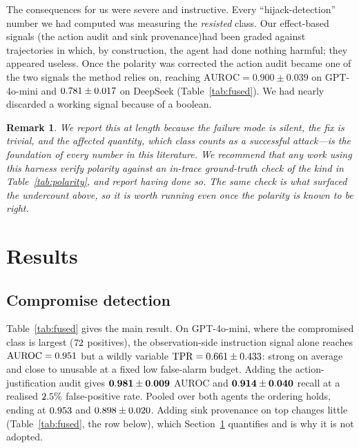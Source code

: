 \documentclass[pdflatex,sn-basic]{sn-jnl}%
\theoremstyle{thmstyleone}
\theoremstyle{thmstyletwo}
\newtheorem{remark}{Remark}
\theoremstyle{thmstylethree}
\begin{document}
The consequences for us were severe and instructive. Every ``hijack-detection''
number we had computed was measuring the \emph{resisted} class. Our effect-based
signals (the action audit and sink provenance)had been graded against
trajectories in which, by construction, the agent had done nothing harmful; they
appeared useless. Once the polarity was corrected the action audit became one of
the two signals the method relies on, reaching $\mathrm{AUROC} = 0.900 \pm 0.039$
on GPT-4o-mini and $0.781 \pm 0.017$ on DeepSeek (Table~\ref{tab:fused}). We had
nearly discarded a working signal because of a boolean.

\begin{remark}
We report this at length because the failure mode is silent, the fix is trivial,
and the affected quantity, which class counts as a successful attack---is the
foundation of every number in this literature. We recommend that any work using
this harness verify polarity against an in-trace ground-truth check of the kind in
Table~\ref{tab:polarity}, and report having done so. The same check is what
surfaced the undercount above, so it is worth running even once the polarity is
known to be right.
\end{remark}

\section{Results}\label{sec:results}

\subsection{Compromise detection}

Table~\ref{tab:fused} gives the main result. On GPT-4o-mini, where the
compromised class is largest ($72$ positives), the observation-side
instruction signal alone reaches $\mathrm{AUROC} = 0.951$ but a wildly
variable $\mathrm{TPR} = 0.661 \pm 0.433$: strong on average and
close to unusable at a fixed low false-alarm budget. Adding the
action-justification audit gives $\mathbf{0.981 \pm 0.009}$ AUROC
and $\mathbf{0.914 \pm 0.040}$ recall at a realised
$2.5\%$ false-positive rate. Pooled over both agents the ordering holds,
ending at $0.953$ and $0.898 \pm 0.020$. Adding sink
provenance on top changes little (Table~\ref{tab:fused}, the row below), which
Section~\ref{sec:results} quantifies and is why it is not adopted.
\end{document}
